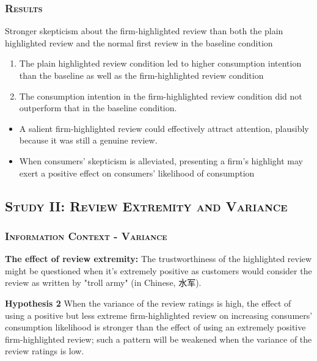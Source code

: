 \documentclass{../presentation}
\begin{document}
    \begin{frame}
        \frametitle{\textsc{Results}}

        Stronger skepticism about the firm-highlighted review than both the plain highlighted review and the normal first review in the baseline condition

        \small

        \begin{enumerate}
            \item The plain highlighted review condition led to higher consumption intention than the baseline as well as the firm-highlighted review condition
            \item The consumption intention in the firm-highlighted review condition did not outperform that in the baseline condition.
        \end{enumerate}

        \begin{itemize}
            \item A salient firm-highlighted review could effectively attract attention, plausibly because it was still a genuine review.
            \item When consumers' skepticism is alleviated, presenting a firm's highlight may exert a positive effect on consumers' likelihood of consumption
        \end{itemize}

    \end{frame}

    \subsection[\textsc{Study II}]{\textsc{Study II: Review Extremity and Variance}}

    \begin{frame}
        \frametitle{\textsc{Information Context - Variance}}

        \small
        \setlength{\parskip}{2em}

        \textrm{\bfseries The effect of review extremity:} The trustworthiness of the highlighted review might be questioned when it's extremely positive as customers would consider the review as written by "troll army" (in Chinese, 水军).

        \textrm{\bfseries Hypothesis 2} When the variance of the review ratings is high, the effect of using a positive but less extreme firm-highlighted review on increasing consumers' consumption likelihood is stronger than the effect of using an extremely positive firm-highlighted review; such a pattern will be weakened when the variance of the review ratings is low.

    \end{frame}
\end{document}

